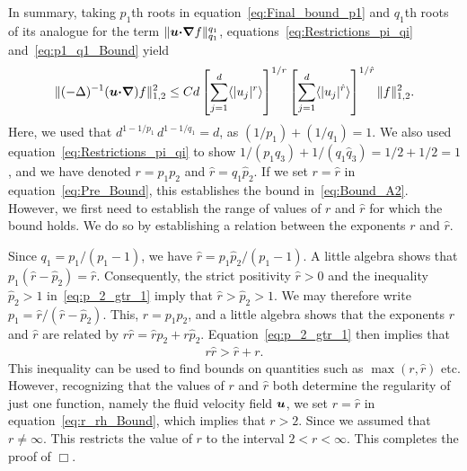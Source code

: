 \documentclass[amsa]{ipart}
\begin{document}
In summary, taking $p_1$th roots in equation~\eqref{eq:Final_bound_p1}
and $q_1$th roots of its analogue for the term
$\|\boldsymbol{u}\mbox{\boldmath${\cdot}$}\mbox{\boldmath${\nabla}$} f\|^{q_1}_{q_1}$,
equations~\eqref{eq:Restrictions_pi_qi} and~\eqref{eq:p1_q1_Bound} yield 
%
\begin{align}\label{eq:Pre_Bound}
  \|(-\Delta)^{-1}(\vecu\bcdot\bnabla)f\|^2_{1,2}
  \leq C d
  \left[\sum_{j=1}^d\langle|u_j|^r\rangle\right]^{1/r}
  \left[\sum_{j=1}^d\langle|u_j|^{\hat{r}}\rangle\right]^{1/ \hat{r}}
  \|f\|^2_{1,2}.
\end{align}
%
Here, we used that $d^{1-1/p_1}\,d^{1-1/q_1}=d$, as
$(1/p_1)+(1/q_1)=1$. We also used
equation~\eqref{eq:Restrictions_pi_qi} to show
$1/(p_1q_3)+1/(q_1\hat{q}_3)=1/2+1/2=1$, 
and we have denoted $r=p_1p_2$ and $\hat{r}=q_1\hat{p}_2$. If we set
$r=\hat{r}$ in equation~\eqref{eq:Pre_Bound}, this establishes the
bound in~\eqref{eq:Bound_A2}. However, we first need to establish the
range of values of $r$ and $\hat{r}$ for which the bound holds. We do
so by establishing a relation between the exponents $r$ and $\hat{r}$.




Since $q_1=p_1/(p_1-1)$, we have $\hat{r}=p_1\hat{p}_2/(p_1-1)$. A
little algebra shows that
$p_1(\hat{r}-\hat{p}_2)=\hat{r}$. Consequently, the strict positivity
$\hat{r}>0$ and the inequality $\hat{p}_2>1$ in~\eqref{eq:p_2_gtr_1}
imply that $\hat{r}>\hat{p}_2>1$. We may therefore write
$p_1=\hat{r}/(\hat{r}-\hat{p}_2)$. This, $r=p_1p_2$, and a little
algebra shows that the exponents $r$ and $\hat{r}$ are related by
$r\hat{r}=\hat{r}p_2+r\hat{p}_2$. Equation~\eqref{eq:p_2_gtr_1} then
implies that 
%
\begin{align}\label{eq:r_rh_Bound}
  r\hat{r}>\hat{r}+r.
\end{align}
%
This inequality can be used to find bounds on quantities
such as $\max(r,\hat{r})$ etc. However, recognizing that the values of
$r$ and $\hat{r}$ both determine the regularity of just one function,
namely the fluid velocity field $\boldsymbol{u}$, we set $r=\hat{r}$ in 
equation~\eqref{eq:r_rh_Bound}, which implies that $r>2$. Since we
assumed that $r\neq\infty$. This restricts the value of $r$ to the interval
$2<r<\infty$. This completes the proof of  $\Box$.
\end{document}
